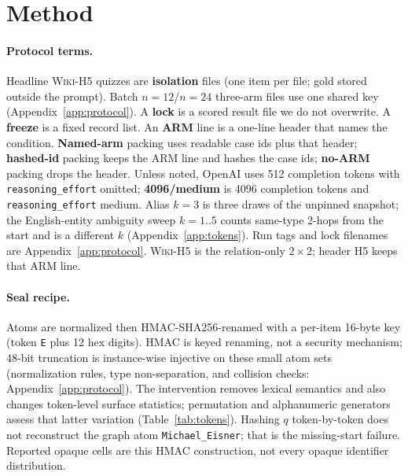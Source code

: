 \documentclass{article}
\begin{document}
\section{Method}
\label{sec:method}

\paragraph{Protocol terms.}
Headline \textsc{Wiki-H5} quizzes are \textbf{isolation} files (one item
per file; gold stored outside the prompt). Batch $n{=}12$/$n{=}24$
three-arm files use one shared key (Appendix~\ref{app:protocol}).
A \textbf{lock} is a scored result file we do not overwrite. A
\textbf{freeze} is a fixed record list.
An \textbf{ARM} line is a one-line header that names the condition.
\textbf{Named-arm} packing uses readable case ids plus that header;
\textbf{hashed-id} packing keeps the ARM line and hashes the case ids;
\textbf{no-ARM} packing drops the header.
Unless noted, OpenAI uses 512 completion tokens with
\texttt{reasoning\_effort} omitted;
\textbf{4096/medium} is 4096 completion tokens and
\texttt{reasoning\_effort} medium.
Alias $k{=}3$ is three draws of the unpinned snapshot; the English-entity
ambiguity sweep $k{=}1..5$ counts same-type 2-hops from the start and is a
different $k$ (Appendix~\ref{app:tokens}).
Run tags and lock filenames are Appendix~\ref{app:protocol}.
\textsc{Wiki-H5} is the relation-only $2{\times}2$; header H5 keeps that
ARM line.

\paragraph{Seal recipe.}
Atoms are normalized then HMAC-SHA256-renamed with a per-item 16-byte key
(token \texttt{E} plus 12 hex digits). HMAC is keyed renaming, not a
security mechanism; 48-bit truncation is instance-wise injective on these
small atom sets (normalization rules, type non-separation, and collision
checks: Appendix~\ref{app:protocol}). The intervention removes lexical
semantics and also changes token-level surface statistics; permutation and
alphanumeric generators assess that latter variation
(Table~\ref{tab:tokens}). Hashing $q$ token-by-token does not reconstruct
the graph atom \texttt{Michael\_Eisner}; that is the missing-start failure.
Reported opaque cells are this HMAC construction, not every opaque
identifier distribution.
\end{document}
